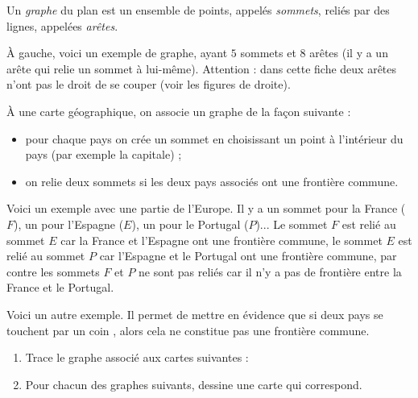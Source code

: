 \documentclass[class=report,crop=false, 12pt]{standalone}
\begin{document}


Un \emph{graphe} du plan est un ensemble de points, appelés \emph{sommets}, reliés par des lignes, appelées \emph{arêtes}.

À gauche, voici un exemple de graphe, ayant $5$ sommets et $8$ arêtes (il y a un arête qui relie un sommet à lui-même). Attention : dans cette fiche deux arêtes n'ont pas le droit de se couper (voir les figures de droite).







\begin{activite}

À une carte géographique, on associe un graphe de la façon suivante :
  \begin{itemize}
    \item pour chaque pays on crée un sommet en choisissant un point à l'intérieur du pays (par exemple la capitale) ;
    \item on relie deux sommets si les deux pays associés ont une frontière commune.
  \end{itemize}
  
  
  Voici un exemple avec une partie de l'Europe.
  Il y a un sommet pour la France ($F$), un pour l'Espagne ($E$), un pour le Portugal ($P$)...
  Le sommet $F$ est relié au sommet $E$ car la France et l'Espagne ont une frontière commune, le sommet $E$ est relié au sommet $P$ car l'Espagne et le Portugal ont une frontière commune, par contre les sommets $F$ et $P$ ne sont pas reliés car il n'y a pas de frontière entre la France et le Portugal.
  
  
  Voici un autre exemple. Il permet de mettre en évidence que si deux pays se touchent \og par un coin \fg{}, alors cela ne constitue pas une frontière commune.
  

  
\begin{enumerate}
	  
  \item Trace le graphe associé aux cartes suivantes :
  
  \item Pour chacun des graphes suivants, dessine une carte qui correspond.
  

\end{enumerate}
\end{activite}
\end{document}
